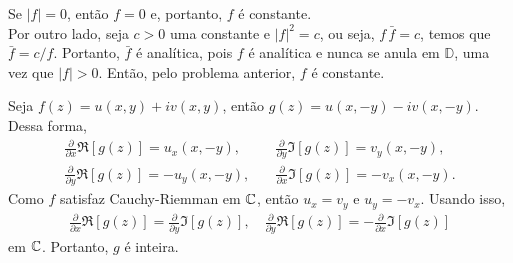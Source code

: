 \begin{questions}
%
\begin{solution}%
    Se $|f| = 0$, então $f = 0$ e, portanto, $f$ é constante.\\
    Por outro lado, seja $c > 0$ uma constante e $|f|^2 = c$, ou seja, $f\,\bar f = c$, temos que $\bar f = c/f$. Portanto, $\bar f$ é analítica, pois $f$ é analítica e nunca se anula em $\mathbb{D}$, uma vez que $|f|>0$. Então, pelo problema anterior, $f$ é constante.
\end{solution}

\begin{solution}
    Seja $f(z) = u(x,y) + i v(x,y)$, então $g(z) = u(x,-y) - i v(x,-y)$. Dessa forma,
    \begin{align*}
        \frac{\partial}{\partial x} \Re[g(z)] = u_x(x,-y), &\quad
        \frac{\partial}{\partial y} \Im[g(z)] = v_y(x,-y),\\
        \frac{\partial}{\partial y} \Re[g(z)] = -u_y(x,-y), &\quad
        \frac{\partial}{\partial x} \Im[g(z)] = -v_x(x,-y).
    \end{align*}
    Como $f$ satisfaz Cauchy-Riemman em ${\mathbb C}$, então $u_x = v_y$ e $u_y = -v_x$. Usando isso,
    \begin{align*}
        \frac{\partial}{\partial x} \Re[g(z)] = \frac{\partial}{\partial y} \Im[g(z)],
            \quad \frac{\partial}{\partial y} \Re[g(z)] = -\frac{\partial}{\partial x} \Im[g(z)]
    \end{align*}
    em ${\mathbb C}$. Portanto, $g$ é inteira.
    

\end{solution}
\end{questions}
